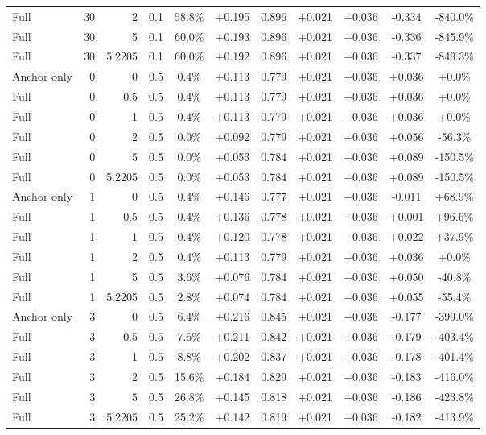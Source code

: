 \begin{table}[htbp]
\begin{tabular}{lrrrccccccc}
Full & 30 & 2 & 0.1 & 58.8\% & +0.195 & 0.896 & +0.021 & +0.036 & -0.334 & -840.0\% \\
Full & 30 & 5 & 0.1 & 60.0\% & +0.193 & 0.896 & +0.021 & +0.036 & -0.336 & -845.9\% \\
Full & 30 & 5.2205 & 0.1 & 60.0\% & +0.192 & 0.896 & +0.021 & +0.036 & -0.337 & -849.3\% \\
Anchor only & 0 & 0 & 0.5 & 0.4\% & +0.113 & 0.779 & +0.021 & +0.036 & +0.036 & +0.0\% \\
Full & 0 & 0.5 & 0.5 & 0.4\% & +0.113 & 0.779 & +0.021 & +0.036 & +0.036 & +0.0\% \\
Full & 0 & 1 & 0.5 & 0.4\% & +0.113 & 0.779 & +0.021 & +0.036 & +0.036 & +0.0\% \\
Full & 0 & 2 & 0.5 & 0.0\% & +0.092 & 0.779 & +0.021 & +0.036 & +0.056 & -56.3\% \\
Full & 0 & 5 & 0.5 & 0.0\% & +0.053 & 0.784 & +0.021 & +0.036 & +0.089 & -150.5\% \\
Full & 0 & 5.2205 & 0.5 & 0.0\% & +0.053 & 0.784 & +0.021 & +0.036 & +0.089 & -150.5\% \\
Anchor only & 1 & 0 & 0.5 & 0.4\% & +0.146 & 0.777 & +0.021 & +0.036 & -0.011 & +68.9\% \\
Full & 1 & 0.5 & 0.5 & 0.4\% & +0.136 & 0.778 & +0.021 & +0.036 & +0.001 & +96.6\% \\
Full & 1 & 1 & 0.5 & 0.4\% & +0.120 & 0.778 & +0.021 & +0.036 & +0.022 & +37.9\% \\
Full & 1 & 2 & 0.5 & 0.4\% & +0.113 & 0.779 & +0.021 & +0.036 & +0.036 & +0.0\% \\
Full & 1 & 5 & 0.5 & 3.6\% & +0.076 & 0.784 & +0.021 & +0.036 & +0.050 & -40.8\% \\
Full & 1 & 5.2205 & 0.5 & 2.8\% & +0.074 & 0.784 & +0.021 & +0.036 & +0.055 & -55.4\% \\
Anchor only & 3 & 0 & 0.5 & 6.4\% & +0.216 & 0.845 & +0.021 & +0.036 & -0.177 & -399.0\% \\
Full & 3 & 0.5 & 0.5 & 7.6\% & +0.211 & 0.842 & +0.021 & +0.036 & -0.179 & -403.4\% \\
Full & 3 & 1 & 0.5 & 8.8\% & +0.202 & 0.837 & +0.021 & +0.036 & -0.178 & -401.4\% \\
Full & 3 & 2 & 0.5 & 15.6\% & +0.184 & 0.829 & +0.021 & +0.036 & -0.183 & -416.0\% \\
Full & 3 & 5 & 0.5 & 26.8\% & +0.145 & 0.818 & +0.021 & +0.036 & -0.186 & -423.8\% \\
Full & 3 & 5.2205 & 0.5 & 25.2\% & +0.142 & 0.819 & +0.021 & +0.036 & -0.182 & -413.9\% \\

\end{tabular}
\end{table}
